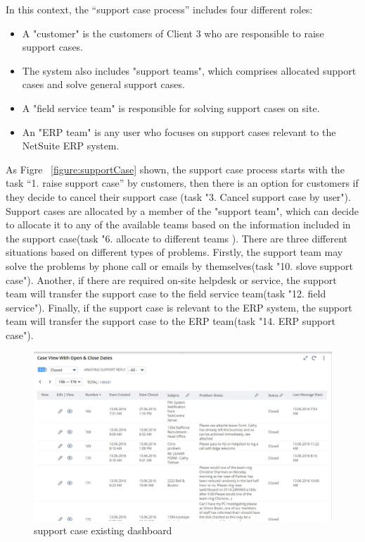 In this context, the “support case process” includes four different roles:
\begin{itemize}

\item A "customer" is the customers of Client 3 who are responsible to raise support cases.
\item The system also includes "support teams", which comprises allocated support cases and solve general support cases.
\item A "field service team" is responsible for solving support cases on site.
\item An "ERP team" is any user who focuses on support cases relevant to the NetSuite ERP system.
\end{itemize}

As Figre ~\ref{figure:supportCase} shown, the support case process starts with the task “1. raise support case” by customers, then there is an option for customers if they decide to cancel their support case (task "3. Cancel support case by user"). Support cases are allocated by a member of the "support team", which can decide to allocate it to any of the available teams based on the information included in the support case(task "6. allocate to different teams ). There are three different situations based on different types of problems. Firstly, the support team may solve the problems by phone call or emails by themselves(task "10. slove support case"). Another, if there are required on-site helpdesk or service, the support team will transfer the support case to the field service team(task "12. field service"). Finally, if the support case is relevant to the ERP system, the support team will transfer the support case to the ERP team(task "14. ERP support case").

\begin{figure}[!htb]
    \centering 
    \includegraphics[scale=0.5]{resource/supportcaseHCS.JPG}
    \caption{support case existing dashboard}
    \label{figure:supportCaseHCS}
\end{figure}


